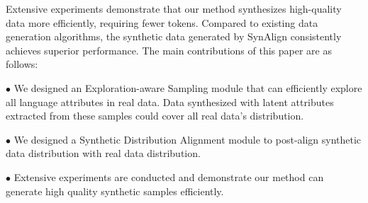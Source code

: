 Extensive experiments demonstrate that our method synthesizes high-quality data more efficiently, requiring fewer tokens. Compared to existing data generation algorithms, the synthetic data generated by SynAlign consistently achieves superior performance. The main contributions of this paper are as follows:

$\bullet$ We designed an Exploration-aware Sampling module that can efficiently explore all language attributes in real data. Data synthesized with latent attributes extracted from these samples could cover all real data's distribution.  

$\bullet$ We designed a Synthetic Distribution Alignment module to post-align synthetic data distribution with real data distribution.

$\bullet$  Extensive experiments are conducted and demonstrate our method can generate high quality synthetic samples efficiently.
